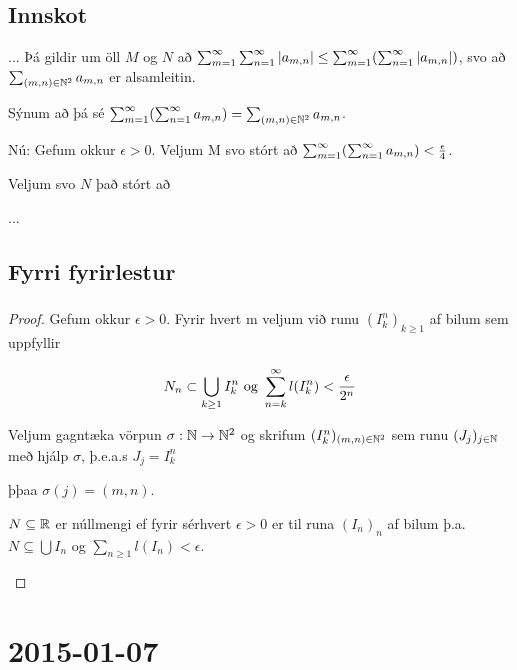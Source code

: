 \documentclass[12pt]{book}
\begin{document}
\section*{Innskot}

{

\def\mn{(m,n)}
\def\amn{a_{m,n}}
\def\summn{\sum_{\mn \in \N^2}}

... %
Þá gildir um öll $M$ og $N$ að $\sum_{m=1}^{\infty} \sum_{n=1}^{\infty} \abs{\amn} \leq \summinfty (\sumoinfty \abs{\amn})$, svo að $\sum_{\mn \in \N^2} \amn$ er alsamleitin.

Sýnum að þá sé $\summinfty ( \sumoinfty \amn ) = \summn \amn$.

Nú: Gefum okkur $\epsilon > 0$. Veljum M svo stórt að $\summinfty ( \sumoinfty \amn ) < \eps{4}$.

Veljum svo $N$ það stórt að

... %


}

\section{Fyrri fyrirlestur}

\subsection{}
\begin{proof}

Gefum okkur $\epsilon > 0$. Fyrir hvert m veljum við runu $(I^n_k)_{k \geq 1}$ af bilum sem uppfyllir

\[N_n \subset \bigcup_{k \geq 1} I_k^n \text{ og } \sum_{n = {k}}^{\infty} l(I^n_k) < \frac{\epsilon}{2^n}\]

Veljum gagntæka vörpun $\sigma: \mathbb{N} \to \mathbb{N}^2$ og skrifum $(I^n_k)_{(m,n) \in \mathbb{N}^2}$ sem runu
$(J_j)_{j \in \mathbb{N}}$ með hjálp $\sigma$, þ.e.a.s $J_j = I^n_k$

þþaa $\sigma (j) = (m,n)$.

\begin{ath}
$N \subseteq \mathbb{R}$ er núllmengi ef fyrir sérhvert $\epsilon > 0$ er til runa $(I_n)_{n}$ af bilum þ.a.
$N \subseteq \bigcup I_n$ og $\sum_{n \geq 1} l(I_n) < \epsilon$.

\end{ath}
\end{proof}
\chapter{2015-01-07}
\end{document}
